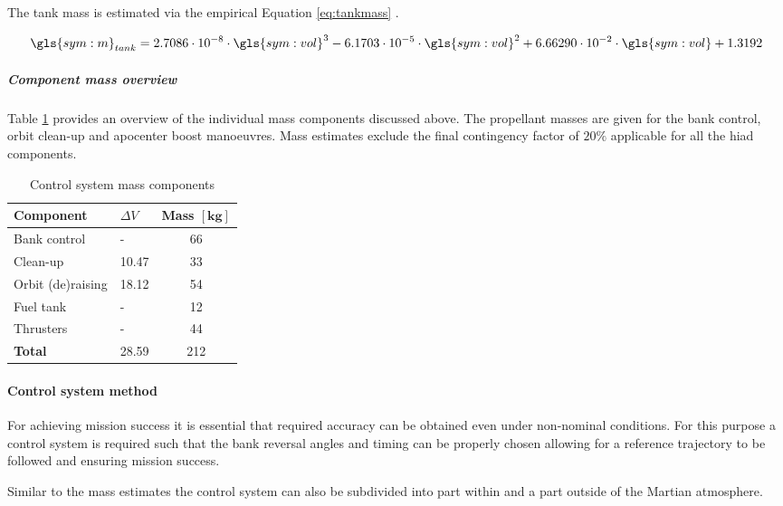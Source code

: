 The tank mass is estimated via the empirical Equation \ref{eq:tankmass} \cite[p.543]{Wertz2011}.

\begin{equation}
\label{eq:tankmass} 
\gls{sym:m}_{tank}=2.7086 \cdot 10^{-8} \cdot \gls{sym:vol}^3 -6.1703 \cdot 10^{-5} \cdot \gls{sym:vol}^2 +6.66290 \cdot 10^{-2}  \cdot \gls{sym:vol} +1.3192
\end{equation}

\subparagraph{Component mass overview}
Table \ref{tab:controlmassbreakdown} provides an overview of the individual mass components discussed above. The propellant masses are given for the bank control, orbit clean-up and apocenter boost manoeuvres. Mass estimates exclude the final contingency factor of $20\%$ applicable for all the \gls{hiad} components.

\begin{table}[h]
\centering
\caption{Control system mass components}
\label{tab:controlmassbreakdown}
\begin{tabular}{|l|l|c|} \hline
\textbf{Component}           &\textbf{$\Delta V$}  & \textbf{Mass $\mathbf{[kg]}$} \\ \hline \hline
Bank control    &  - &			 66       \\ \hline
Clean-up         & 10.47  &		  33       \\ \hline
Orbit (de)raising& 18.12  &		  54       \\ \hline
Fuel tank              		 & -  &  12      \\ \hline
Thrusters                	 & -  &  44     \\ \hline \hline
\textbf{Total}               & 28.59  &  212      \\ \hline
\end{tabular}
\end{table}

\paragraph{Control system method}
For achieving mission success it is essential that required accuracy can be obtained even under non-nominal conditions. For this purpose a control system is required such that the bank reversal angles and timing can be properly chosen allowing for a reference trajectory to be followed and ensuring mission success.

Similar to the mass estimates the control system can  also be subdivided into part within and a part outside of the Martian atmosphere.


